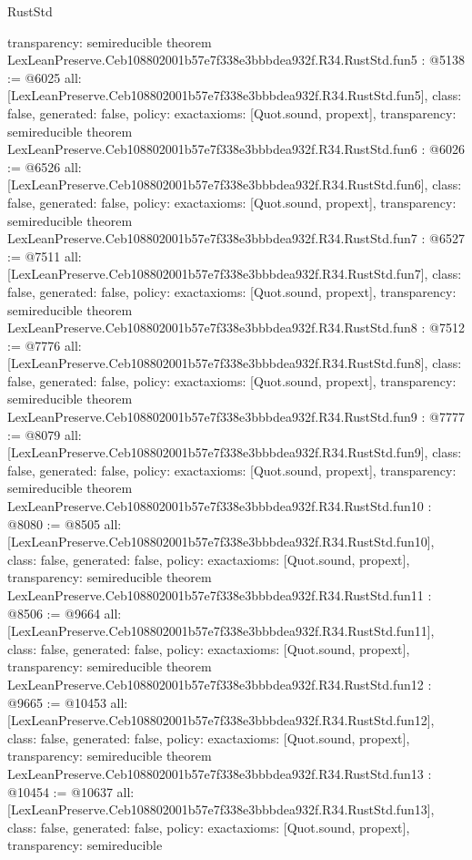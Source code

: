 \begin{lexlean}{RustStd}
\begin{coremodule}
{  transparency: semireducible
}
theorem LexLeanPreserve.Ceb108802001b57e7f338e3bbbdea932f.R34.RustStd.fun5 : @5138 := @6025 {
  all: [LexLeanPreserve.Ceb108802001b57e7f338e3bbbdea932f.R34.RustStd.fun5],
  class: false,
  generated: false,
  policy: exact{axioms: [Quot.sound, propext]},
  transparency: semireducible
}
theorem LexLeanPreserve.Ceb108802001b57e7f338e3bbbdea932f.R34.RustStd.fun6 : @6026 := @6526 {
  all: [LexLeanPreserve.Ceb108802001b57e7f338e3bbbdea932f.R34.RustStd.fun6],
  class: false,
  generated: false,
  policy: exact{axioms: [Quot.sound, propext]},
  transparency: semireducible
}
theorem LexLeanPreserve.Ceb108802001b57e7f338e3bbbdea932f.R34.RustStd.fun7 : @6527 := @7511 {
  all: [LexLeanPreserve.Ceb108802001b57e7f338e3bbbdea932f.R34.RustStd.fun7],
  class: false,
  generated: false,
  policy: exact{axioms: [Quot.sound, propext]},
  transparency: semireducible
}
theorem LexLeanPreserve.Ceb108802001b57e7f338e3bbbdea932f.R34.RustStd.fun8 : @7512 := @7776 {
  all: [LexLeanPreserve.Ceb108802001b57e7f338e3bbbdea932f.R34.RustStd.fun8],
  class: false,
  generated: false,
  policy: exact{axioms: [Quot.sound, propext]},
  transparency: semireducible
}
theorem LexLeanPreserve.Ceb108802001b57e7f338e3bbbdea932f.R34.RustStd.fun9 : @7777 := @8079 {
  all: [LexLeanPreserve.Ceb108802001b57e7f338e3bbbdea932f.R34.RustStd.fun9],
  class: false,
  generated: false,
  policy: exact{axioms: [Quot.sound, propext]},
  transparency: semireducible
}
theorem LexLeanPreserve.Ceb108802001b57e7f338e3bbbdea932f.R34.RustStd.fun10 : @8080 := @8505 {
  all: [LexLeanPreserve.Ceb108802001b57e7f338e3bbbdea932f.R34.RustStd.fun10],
  class: false,
  generated: false,
  policy: exact{axioms: [Quot.sound, propext]},
  transparency: semireducible
}
theorem LexLeanPreserve.Ceb108802001b57e7f338e3bbbdea932f.R34.RustStd.fun11 : @8506 := @9664 {
  all: [LexLeanPreserve.Ceb108802001b57e7f338e3bbbdea932f.R34.RustStd.fun11],
  class: false,
  generated: false,
  policy: exact{axioms: [Quot.sound, propext]},
  transparency: semireducible
}
theorem LexLeanPreserve.Ceb108802001b57e7f338e3bbbdea932f.R34.RustStd.fun12 : @9665 := @10453 {
  all: [LexLeanPreserve.Ceb108802001b57e7f338e3bbbdea932f.R34.RustStd.fun12],
  class: false,
  generated: false,
  policy: exact{axioms: [Quot.sound, propext]},
  transparency: semireducible
}
theorem LexLeanPreserve.Ceb108802001b57e7f338e3bbbdea932f.R34.RustStd.fun13 : @10454 := @10637 {
  all: [LexLeanPreserve.Ceb108802001b57e7f338e3bbbdea932f.R34.RustStd.fun13],
  class: false,
  generated: false,
  policy: exact{axioms: [Quot.sound, propext]},
  transparency: semireducible
}
\end{coremodule}
\end{lexlean}

